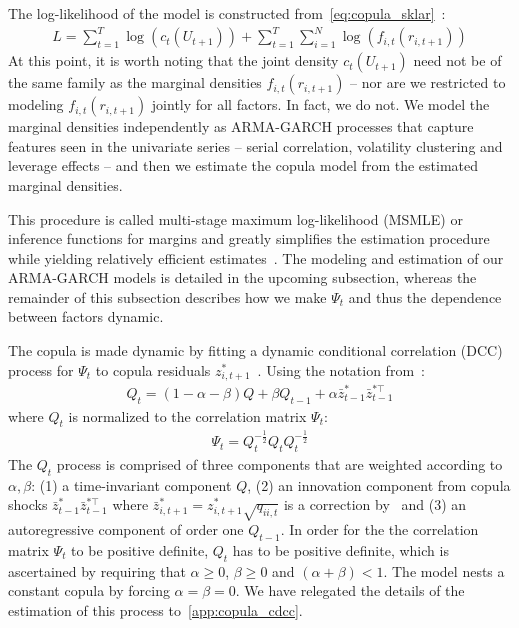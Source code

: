 The log-likelihood of the model is constructed from~\autoref{eq:copula_sklar}~\autocite[cf.]{ChristoffersenErrunzaJacobLanglois2012}:
\begin{align}
  L =
    \sum_{t=1}^T \log(c_t(U_{t+1})) +
    \sum_{t=1}^T \sum_{i=1}^N \log(f_{i,t}(r_{i,t+1}))
\end{align}
At this point, it is worth noting that the joint density $c_t(U_{t+1})$ need not be of the same family as the marginal densities $f_{i,t}(r_{i,t+1})$ -- nor are we restricted to modeling $f_{i,t}(r_{i,t+1})$ jointly for all factors. In fact, we do not. We model the marginal densities independently as ARMA-GARCH processes that capture features seen in the univariate series -- serial correlation, volatility clustering and leverage effects -- and then we estimate the copula model from the estimated marginal densities.

This procedure is called multi-stage maximum log-likelihood (MSMLE) or inference functions for margins and greatly simplifies the estimation procedure while yielding relatively efficient estimates~\autocite{Patton2006,Joe1997}. The modeling and estimation of our ARMA-GARCH models is detailed in the upcoming subsection, whereas the remainder of this subsection describes how we make $\Psi_t$ and thus the dependence between factors dynamic.

The copula is made dynamic by fitting a dynamic conditional correlation (DCC) process for $\Psi_t$ to copula residuals $z_{i,t+1}^*$~\autocite{Engle2002}. Using the notation from~\textcite{ChristoffersenLanglois2013}:
\begin{align}
  Q_t = (1 - \alpha - \beta) Q
    + \beta Q_{t-1}
    + \alpha \bar{z}_{t-1}^* \bar{z}_{t-1}^{*\top}
\end{align}
where $Q_t$ is normalized to the correlation matrix $\Psi_t$:
\begin{align}
  \Psi_t = Q_t^{-\frac{1}{2}} Q_t Q_t^{-\frac{1}{2}}
\end{align}
The $Q_t$ process is comprised of three components that are weighted according to $\alpha, \beta$: (1) a time-invariant component $Q$, (2) an innovation component from copula shocks $\bar{z}_{t-1}^{*} \bar{z}_{t-1}^{*\top}$ where $\bar{z}_{i,t+1}^* = z_{i,t+1}^* \sqrt{q_{ii,t}}$ is a correction by~\textcite{Aielli2013} and (3) an autoregressive component of order one $Q_{t-1}$. In order for the the correlation matrix $\Psi_t$ to be positive definite, $Q_t$ has to be positive definite, which is ascertained by requiring that $\alpha \geq 0$, $\beta \geq 0$ and $(\alpha + \beta) < 1$. The model nests a constant copula by forcing $\alpha = \beta = 0$. We have relegated the details of the estimation of this process to~\autoref{app:copula_cdcc}.


